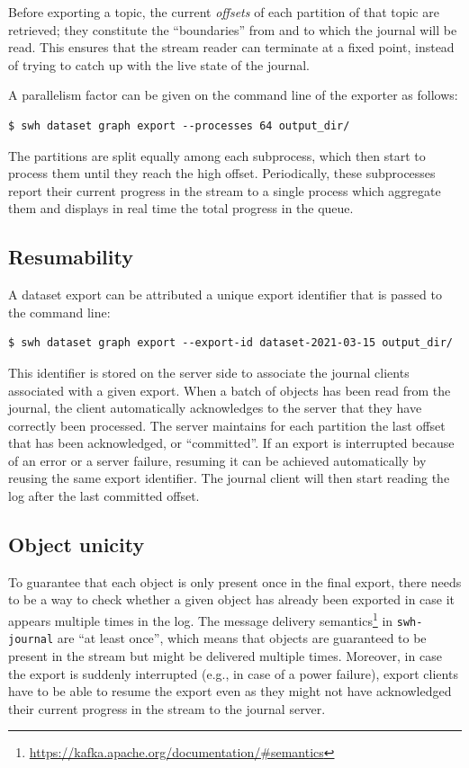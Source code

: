 Before exporting a topic, the current \emph{offsets} of each partition of that
topic are retrieved; they constitute the ``boundaries'' from and to which the
journal will be read. This ensures that the stream reader can terminate at a
fixed point, instead of trying to catch up with the live state of the journal.

A parallelism factor can be given on the command line of the exporter as
follows:

\begin{verbatim}
$ swh dataset graph export --processes 64 output_dir/
\end{verbatim}

The partitions are split equally among each subprocess, which then start to
process them until they reach the high offset. Periodically, these subprocesses
report their current progress in the stream to a single process which aggregate
them and displays in real time the total progress in the queue.

\subsection{Resumability}

A dataset export can be attributed a unique export identifier that is passed
to the command line:

\begin{verbatim}
$ swh dataset graph export --export-id dataset-2021-03-15 output_dir/
\end{verbatim}

This identifier is stored on the server side to associate the journal clients
associated with a given export.
When a batch of objects has been read from the journal, the client
automatically acknowledges to the server that they have correctly been
processed. The server maintains for each partition the last offset that has
been acknowledged, or ``committed''.
If an export is interrupted because of an error or a server failure, resuming
it can be achieved automatically by reusing the same export identifier. The
journal client will then start reading the log after the last committed offset.

\subsection{Object unicity}
\label{sec:dataset-export-unicity}

To guarantee that each object is only present once in the final export, there
needs to be a way to check whether a given object has already been exported in
case it appears multiple times in the log. The message delivery
semantics\footnote{\url{https://kafka.apache.org/documentation/\#semantics}} in
\texttt{swh-journal} are ``at least once'', which means that objects are
guaranteed to be present in the stream but might be delivered multiple times.
Moreover, in case the export is suddenly interrupted (e.g., in case of a power
failure), export clients have to be able to resume the export even as they
might not have acknowledged their current progress in the stream to the journal
server.

